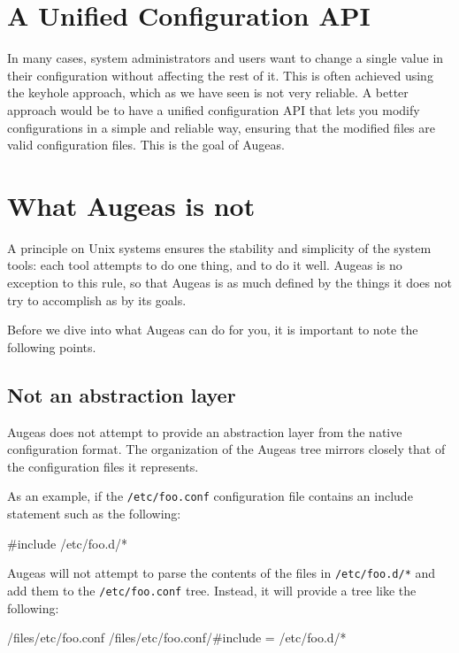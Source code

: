 
\section{A Unified Configuration API}

In many cases, system administrators and users want to change a single value in their configuration without affecting the rest of it. This is often achieved using the keyhole approach, which as we have seen is not very reliable. A better approach would be to have a unified configuration API that lets you modify configurations in a simple and reliable way, ensuring that the modified files are valid configuration files. This is the goal of Augeas.

\section{What Augeas is not}

A principle on Unix systems ensures the stability and simplicity of the system tools: each tool attempts to do one thing, and to do it well. Augeas is no exception to this rule, so that Augeas is as much defined by the things it does not try to accomplish as by its goals.

Before we dive into what Augeas can do for you, it is important to note the following points.

\subsection{Not an abstraction layer}

Augeas does not attempt to provide an abstraction layer from the native configuration format. The organization of the Augeas tree mirrors closely that of the configuration files it represents.

As an example, if the \nolinkurl{/etc/foo.conf} configuration file contains an include statement such as the following:

\begin{bash}[]
#include /etc/foo.d/*
\end{bash}

Augeas will not attempt to parse the contents of the files in \nolinkurl{/etc/foo.d/*} and add them to the \nolinkurl{/etc/foo.conf} tree. Instead, it will provide a tree like the following:

\begin{augtoolsh}[]
/files/etc/foo.conf
/files/etc/foo.conf/#include = /etc/foo.d/*
\end{augtoolsh}

